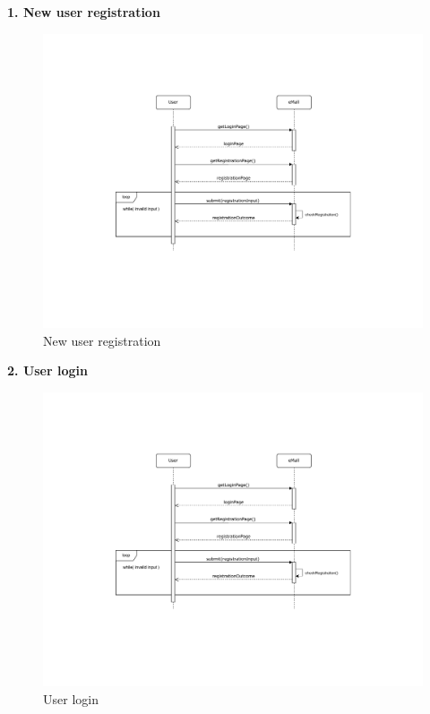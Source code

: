 \documentclass[11pt]{article}
\begin{document}
\begin{description}
    \item \textbf{1. New user registration}
    \begin{figure}[!ht]
        \centering
        \includegraphics[page={1}, trim=5cm 5.6cm 5cm 4.4cm, width=0.8\linewidth, clip]{SequenceDiagrams.pdf}
        \caption{New user registration}
    \end{figure}
    
    \item \textbf{2. User login}
    \begin{figure}[!ht]
        \centering
        \includegraphics[page={2}, trim=5cm 9cm 5cm 3.6cm, width=0.8\linewidth, clip]{SequenceDiagrams.pdf}
        \caption{User login}
    \end{figure}
    
    \newpage
    

\end{description}
\end{document}
